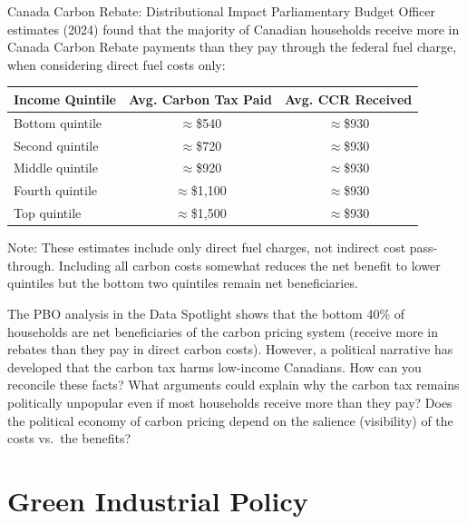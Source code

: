 \begin{databox}{Canada Carbon Rebate: Distributional Impact}
Parliamentary Budget Officer estimates (2024) found that the majority of Canadian
households receive more in Canada Carbon Rebate payments than they pay through the
federal fuel charge, when considering direct fuel costs only:
\begin{center}
\begin{tabular}{lcc}
\toprule
\textbf{Income Quintile} & \textbf{Avg. Carbon Tax Paid} & \textbf{Avg. CCR Received} \\
\midrule
Bottom quintile & $\approx$\$540 & $\approx$\$930 \\
Second quintile & $\approx$\$720 & $\approx$\$930 \\
Middle quintile & $\approx$\$920 & $\approx$\$930 \\
Fourth quintile & $\approx$\$1{,}100 & $\approx$\$930 \\
Top quintile & $\approx$\$1{,}500 & $\approx$\$930 \\
\bottomrule
\end{tabular}
\end{center}
Note: These estimates include only direct fuel charges, not indirect cost pass-through.
Including all carbon costs somewhat reduces the net benefit to lower quintiles but the
bottom two quintiles remain net beneficiaries.
\end{databox}

\begin{thinkbox}
The PBO analysis in the Data Spotlight shows that the bottom 40\% of households are
net beneficiaries of the carbon pricing system (receive more in rebates than they pay
in direct carbon costs). However, a political narrative has developed that the carbon
tax harms low-income Canadians. How can you reconcile these facts? What arguments could
explain why the carbon tax remains politically unpopular even if most households
receive more than they pay? Does the political economy of carbon pricing depend on the
salience (visibility) of the costs vs.\ the benefits?
\end{thinkbox}

\section{Green Industrial Policy}

